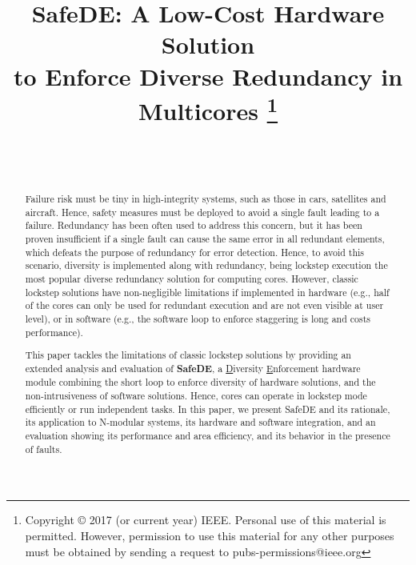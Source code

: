 \documentclass[journal]{IEEEtran}
\begin{document}
\title{SafeDE: A Low-Cost Hardware Solution \\ to Enforce Diverse Redundancy in Multicores \thanks{Copyright © 2017 (or current year) IEEE. Personal use of this material is permitted.  However, permission to use this material for any other purposes must be obtained by sending a request to pubs-permissions@ieee.org}}

\author{
  \\
  \\
}

\maketitle

\begin{abstract}
Failure risk must be tiny
in high-integrity systems, such as those in cars, satellites and aircraft. Hence, safety measures must be deployed to avoid a single fault leading to a failure. Redundancy has been often used to address this concern, but it has been proven insufficient if a single fault can cause the same error in all redundant elements, which defeats the purpose of redundancy for error detection. Hence, to avoid this scenario, diversity is implemented along with redundancy, being lockstep execution the most popular diverse redundancy solution for computing cores. However, classic lockstep solutions have non-negligible limitations if implemented in hardware (e.g., half of the cores can only be used for redundant execution and are not even visible at user level), or in software (e.g., the software loop to enforce staggering is long and costs performance).

This paper tackles the limitations of classic lockstep solutions by 
providing an extended analysis and evaluation of
\textbf{SafeDE}, a \underline{D}iversity \underline{E}nforcement hardware module combining the short loop to enforce diversity of hardware solutions, and the non-intrusiveness of software solutions. Hence, cores can operate in lockstep mode efficiently or run independent tasks. 
In this paper, we present SafeDE and its rationale, its application to N-modular systems, its hardware and software integration, and an evaluation showing its performance and area efficiency, and its behavior in 
the presence
of faults.
\end{abstract}
\end{document}
